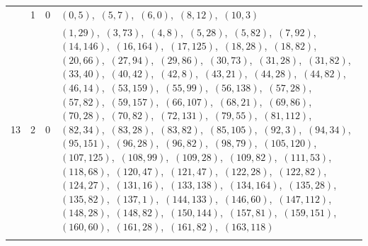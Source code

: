 \documentclass[11pt]{article}
\begin{document}
\begin{longtable}{@{}rrl>{\raggedright\arraybackslash}p{}@{}}
\addlinespace[3pt]
13 & 1 & $0$ & $(0,5)$,\allowbreak\ $(5,7)$,\allowbreak\ $(6,0)$,\allowbreak\ $(8,12)$,\allowbreak\ $(10,3)$\\
13 & 2 & $0$ & $(1,29)$,\allowbreak\ $(3,73)$,\allowbreak\ $(4,8)$,\allowbreak\ $(5,28)$,\allowbreak\ $(5,82)$,\allowbreak\ $(7,92)$,\allowbreak\ $(14,146)$,\allowbreak\ $(16,164)$,\allowbreak\ $(17,125)$,\allowbreak\ $(18,28)$,\allowbreak\ $(18,82)$,\allowbreak\ $(20,66)$,\allowbreak\ $(27,94)$,\allowbreak\ $(29,86)$,\allowbreak\ $(30,73)$,\allowbreak\ $(31,28)$,\allowbreak\ $(31,82)$,\allowbreak\ $(33,40)$,\allowbreak\ $(40,42)$,\allowbreak\ $(42,8)$,\allowbreak\ $(43,21)$,\allowbreak\ $(44,28)$,\allowbreak\ $(44,82)$,\allowbreak\ $(46,14)$,\allowbreak\ $(53,159)$,\allowbreak\ $(55,99)$,\allowbreak\ $(56,138)$,\allowbreak\ $(57,28)$,\allowbreak\ $(57,82)$,\allowbreak\ $(59,157)$,\allowbreak\ $(66,107)$,\allowbreak\ $(68,21)$,\allowbreak\ $(69,86)$,\allowbreak\ $(70,28)$,\allowbreak\ $(70,82)$,\allowbreak\ $(72,131)$,\allowbreak\ $(79,55)$,\allowbreak\ $(81,112)$,\allowbreak\ $(82,34)$,\allowbreak\ $(83,28)$,\allowbreak\ $(83,82)$,\allowbreak\ $(85,105)$,\allowbreak\ $(92,3)$,\allowbreak\ $(94,34)$,\allowbreak\ $(95,151)$,\allowbreak\ $(96,28)$,\allowbreak\ $(96,82)$,\allowbreak\ $(98,79)$,\allowbreak\ $(105,120)$,\allowbreak\ $(107,125)$,\allowbreak\ $(108,99)$,\allowbreak\ $(109,28)$,\allowbreak\ $(109,82)$,\allowbreak\ $(111,53)$,\allowbreak\ $(118,68)$,\allowbreak\ $(120,47)$,\allowbreak\ $(121,47)$,\allowbreak\ $(122,28)$,\allowbreak\ $(122,82)$,\allowbreak\ $(124,27)$,\allowbreak\ $(131,16)$,\allowbreak\ $(133,138)$,\allowbreak\ $(134,164)$,\allowbreak\ $(135,28)$,\allowbreak\ $(135,82)$,\allowbreak\ $(137,1)$,\allowbreak\ $(144,133)$,\allowbreak\ $(146,60)$,\allowbreak\ $(147,112)$,\allowbreak\ $(148,28)$,\allowbreak\ $(148,82)$,\allowbreak\ $(150,144)$,\allowbreak\ $(157,81)$,\allowbreak\ $(159,151)$,\allowbreak\ $(160,60)$,\allowbreak\ $(161,28)$,\allowbreak\ $(161,82)$,\allowbreak\ $(163,118)$\\
\addlinespace[3pt]
\end{longtable}
\endgroup
\end{document}
